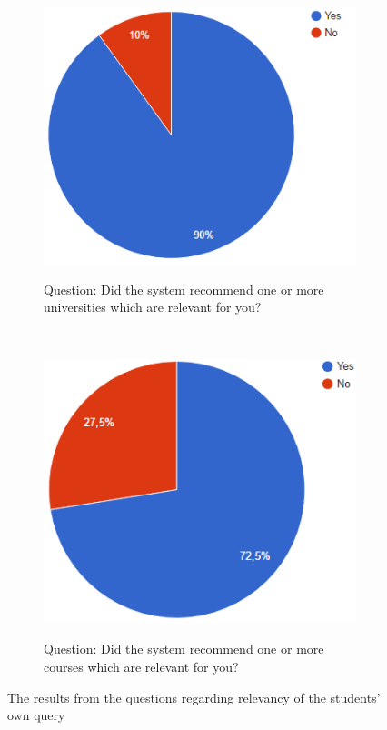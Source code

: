 \begin{figure}[H]
    \centering
    \begin{subfigure}[b]{0.41\textwidth}
        \caption{Question: Did the system recommend one or more universities which are relevant for you?}
        \includegraphics[width=\textwidth]{fig/results/recommendation_1.PNG}
        \label{fig:gull}
    \end{subfigure}
    ~ \qquad
    \begin{subfigure}[b]{0.40\textwidth}
        \caption{Question: Did the system recommend one or more courses which are relevant for you?}
        \includegraphics[width=\textwidth]{fig/results/recommendation_2.PNG}
        \label{fig:tiger}
    \end{subfigure}
    \caption{The results from the questions regarding relevancy of the students' own query}\label{fig:results_recommendation}
\end{figure}

